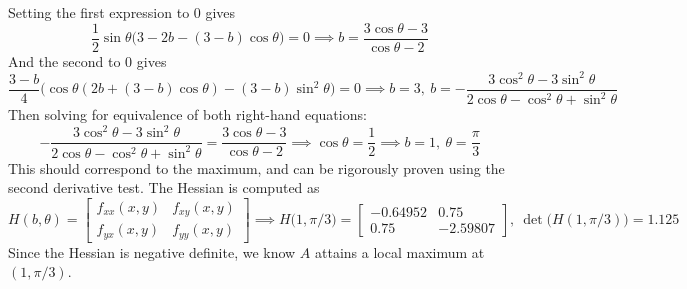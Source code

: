 \documentclass{article}
\begin{document}
Setting the first expression to 0 gives
$$ \frac{1}{2} \sin \theta \big(3 - 2b - (3-b)\cos \theta) = 0 \implies b = \frac{3 \cos \theta  - 3}{\cos \theta - 2}$$
And the second to 0 gives 
$$  \frac{3-b}{4} \big (\cos \theta (2b + (3-b)\cos \theta ) - (3-b) \sin^2 \theta \big) =0  \implies b = 3, \ b = -\frac{3\cos^2 \theta - 3 \sin^2 \theta}{2 \cos \theta 	- \cos^2 \theta + \sin ^2 \theta}$$
Then solving for equivalence of both right-hand equations:
$$ -\frac{3\cos^2 \theta - 3 \sin^2 \theta}{2 \cos \theta 	- \cos^2 \theta + \sin ^2 \theta} = \frac{3 \cos \theta  - 3}{\cos \theta - 2} \implies \cos \theta = \frac{1}{2} \implies b = 1,  \ \theta = \frac{\pi}{3} $$
This should correspond to the maximum, and can be rigorously proven using the second derivative test. The Hessian is computed as
$$ H(b,\theta) = \begin{bmatrix} f_{xx}(x,y) & f_{xy}(x,y)\\ f_{yx}(x,y) & f_{yy}(x,y) \end{bmatrix} \implies H \big( 1, \pi/3 \big) = \begin{bmatrix} -0.64952 & 0.75 \\ 0.75 & -2.59807 \end{bmatrix}, \ \det \big( H(1, \pi/3) \big)=1.125$$ 
Since the Hessian is negative definite, we know $A$ attains a local maximum at $(1, \pi/3)$. 
\end{document}

